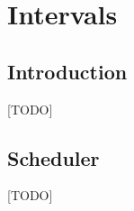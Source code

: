 
\chapter{Intervals}
\label{cha:intervals}

\section{Introduction}
\label{sec:intervals-introduction}

[TODO]


\section{Scheduler}
\label{sec:intervals-scheduler}

[TODO]


